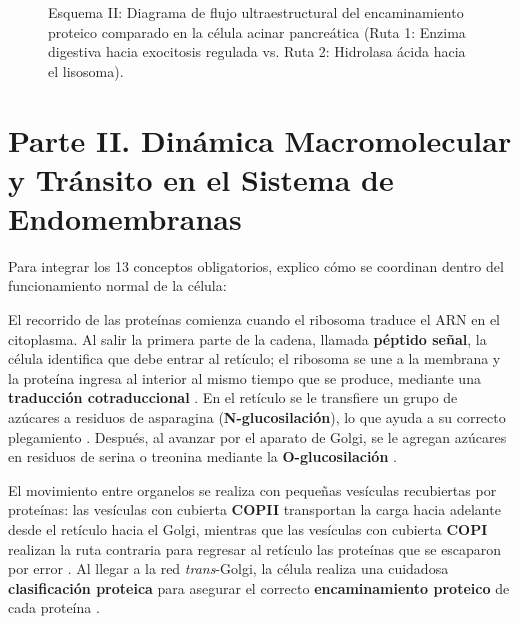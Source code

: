 \documentclass[12pt,spanish,letterpaper,oneside]{article}
\begin{document}
\begin{figure}[htbp]
\caption{Esquema II: Diagrama de flujo ultraestructural del encaminamiento proteico comparado en la célula acinar pancreática (Ruta 1: Enzima digestiva hacia exocitosis regulada vs. Ruta 2: Hidrolasa ácida hacia el lisosoma).}
\label{fig:esquema_rutas}
\end{figure}

\clearpage

\section{Parte II. Dinámica Macromolecular y Tránsito en el Sistema de Endomembranas}
Para integrar los 13 conceptos obligatorios, explico cómo se coordinan dentro del funcionamiento normal de la célula:

El recorrido de las proteínas comienza cuando el ribosoma traduce el ARN en el citoplasma. Al salir la primera parte de la cadena, llamada \textbf{péptido señal}, la célula identifica que debe entrar al retículo; el ribosoma se une a la membrana y la proteína ingresa al interior al mismo tiempo que se produce, mediante una \textbf{traducción cotraduccional} \parencite{salazar2018biologia, alberts2022molecular}. En el retículo se le transfiere un grupo de azúcares a residuos de asparagina (\textbf{N-glucosilación}), lo que ayuda a su correcto plegamiento \parencite{mathews2013bioquimica}. Después, al avanzar por el aparato de Golgi, se le agregan azúcares en residuos de serina o treonina mediante la \textbf{O-glucosilación} \parencite{karp2019biologia}.

El movimiento entre organelos se realiza con pequeñas vesículas recubiertas por proteínas: las vesículas con cubierta \textbf{COPII} transportan la carga hacia adelante desde el retículo hacia el Golgi, mientras que las vesículas con cubierta \textbf{COPI} realizan la ruta contraria para regresar al retículo las proteínas que se escaparon por error \parencite{fortoul2020histologia, lodish2021molecular}. Al llegar a la red \textit{trans}-Golgi, la célula realiza una cuidadosa \textbf{clasificación proteica} para asegurar el correcto \textbf{encaminamiento proteico} de cada proteína \parencite{alberts2022molecular}.
\end{document}
